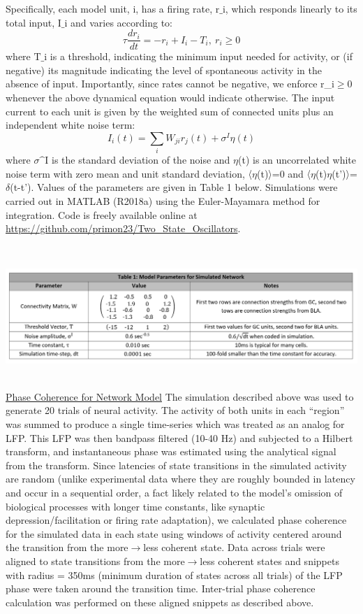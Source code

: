 \begin{refsection}
Specifically, each model unit, i,  has a firing rate, $\text{r_i}$, which responds linearly to its total input, $\text{I_i}$ and varies according to:
$$\tau \frac{dr_i}{dt}=-r_i+I_i-T_i,\ r_i\ge0$$
where $\text{T_i}$ is a threshold, indicating the minimum input needed for activity, or (if negative) its magnitude indicating the level of spontaneous activity in the absence of input. Importantly, since rates cannot be negative, we enforce r_i$\ge$0 whenever the above dynamical equation would indicate otherwise. The input current to each unit is given by the weighted sum of connected units plus an independent white noise term:
$$I_i (t)=\sum_{i}W_{ji} r_j (t)+\sigma^I \eta(t)$$
where $\sigma\text{^I}$ is the standard deviation of the noise and $\eta$(t) is an uncorrelated white noise term with zero mean and unit standard deviation, 〈$\eta$(t)〉=0 and 〈$\eta$(t)$\eta$(t')〉=$\delta$(t-t').
Values of the parameters are given in Table 1 below. Simulations were carried out in MATLAB (R2018a) using the Euler-Mayamara method for integration. Code is freely available online at \url{https://github.com/primon23/Two_State_Oscillators}.
\newline

\\
\noindent
\begin{tabular}
\centering
    \includegraphics[width=\linewidth]{mahmood_22_figures/table1.PNG}
\end{tabular}
\\

\noindent\underline{Phase Coherence for Network Model}
The simulation described above was used to generate 20 trials of neural activity. The activity of both units in each “region” was summed to produce a single time-series which was treated as an analog for LFP. This LFP was then bandpass filtered (10-40 Hz) and subjected to a Hilbert transform, and instantaneous phase was estimated using the analytical signal from the transform. Since latencies of state transitions in the simulated activity are random (unlike experimental data where they are roughly bounded in latency and occur in a sequential order, a fact likely related to the model’s omission of biological processes with longer time constants, like synaptic depression/facilitation or firing rate adaptation), we calculated phase coherence for the simulated data in each state using windows of activity centered around the transition from the more$\rightarrow$less coherent state. Data across trials were aligned to state transitions from the more$\rightarrow$less coherent states and snippets with radius = 350ms (minimum duration of states across all trials) of the LFP phase were taken around the transition time. Inter-trial phase coherence calculation was performed on these aligned snippets as described above.


\end{refsection}
